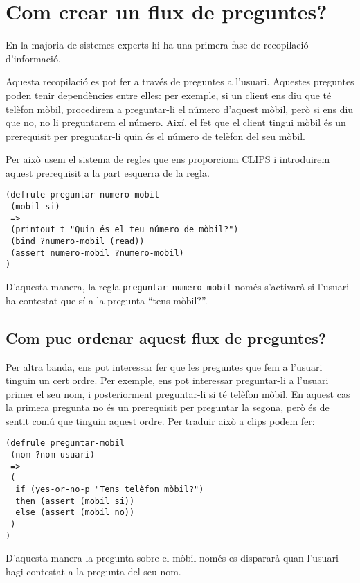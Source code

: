 \documentclass[11pt,svgnames]{scrbook}
\begin{document}
\section{Com crear un flux de preguntes?}


En la majoria de sistemes experts hi ha una primera fase de recopilació d'informació.

Aquesta recopilació es pot fer a través de preguntes a l'usuari. Aquestes preguntes poden tenir dependències entre elles: per exemple, si un client ens diu que té telèfon mòbil, procedirem a preguntar-li el número d'aquest mòbil, però si ens diu que no, no li preguntarem el número. Així, el fet que el client tingui mòbil és un prerequisit per preguntar-li quin és el número de telèfon del seu mòbil.

Per això usem el sistema de regles que ens proporciona CLIPS i introduirem aquest prerequisit a la part esquerra de la regla.

\begin{verbatim}
(defrule preguntar-numero-mobil
 (mobil si)
 =>
 (printout t "Quin és el teu número de mòbil?")
 (bind ?numero-mobil (read))
 (assert numero-mobil ?numero-mobil)
)
\end{verbatim}

D'aquesta manera, la regla \texttt{preguntar-numero-mobil} només s'activarà
si l'usuari ha contestat que sí a la pregunta ``tens mòbil?''.


\subsection{Com puc ordenar aquest flux de preguntes?}


Per altra banda, ens pot interessar fer que les preguntes que fem a l'usuari tinguin un cert ordre. Per exemple, ens pot interessar preguntar-li a l'usuari primer el seu nom, i posteriorment preguntar-li si té telèfon mòbil. En aquest cas la primera pregunta no és un prerequisit per preguntar la segona, però és de sentit comú que tinguin aquest ordre. Per traduir això a clips podem fer:

\begin{verbatim}
(defrule preguntar-mobil
 (nom ?nom-usuari)
 =>
 (
  if (yes-or-no-p "Tens telèfon mòbil?")
  then (assert (mobil si))
  else (assert (mobil no))
 )
)
\end{verbatim}

D'aquesta manera la pregunta sobre el mòbil només es dispararà quan l'usuari hagi contestat a la pregunta del seu nom.
\end{document}
